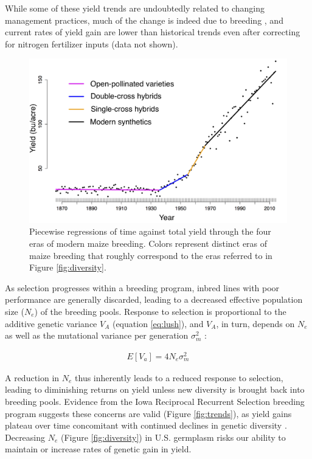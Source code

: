 \documentclass[12pt]{article}
\begin{document}
While some of these yield trends are undoubtedly related to changing management practices, much of the change is indeed due to breeding \citep{Duvick:2001fy}, and current rates of yield gain are lower than historical trends even after correcting for nitrogen fertilizer inputs (data not shown). 

\begin{figure}
\centering
\includegraphics[width=0.7\linewidth]{yield.png}
\caption{Piecewise regressions of time against total yield through the four eras of modern maize breeding. Colors represent distinct eras of maize breeding that roughly correspond to the eras  referred to in Figure \ref{fig:diversity}.} 
\label{fig:piecewise}
\end{figure}

As selection progresses within a breeding program, inbred lines with poor performance are generally discarded, leading to a decreased effective population size ($N_e$) of the breeding pools.
Response to selection is proportional to the additive genetic variance $V_A$ (equation \ref{eq:lush}), and $V_A$, in turn, depends on $N_e$ as well as the mutational variance per generation ${\sigma}_m^2$ \citep{whitlock1999neutral}:

\begin{align}
E[V_a] = 4N_e {\sigma}_m^2
\label{eq:whitlock}
\end{align}

A reduction in $N_e$ thus inherently leads to a reduced response to selection, leading to diminishing returns on yield unless new diversity is brought back into breeding pools.
Evidence from the Iowa Reciprocal Recurrent Selection breeding program suggests these concerns are valid (Figure \ref{fig:trends}), as yield gains plateau over time \citep{rouse2003selection} concomitant with continued declines in genetic diversity \citep{Gerke:2013tw}.
Decreasing $N_e$ (Figure \ref{fig:diversity}) in U.S.  germplasm risks our ability to maintain or increase rates of genetic gain in yield.
\end{document}
